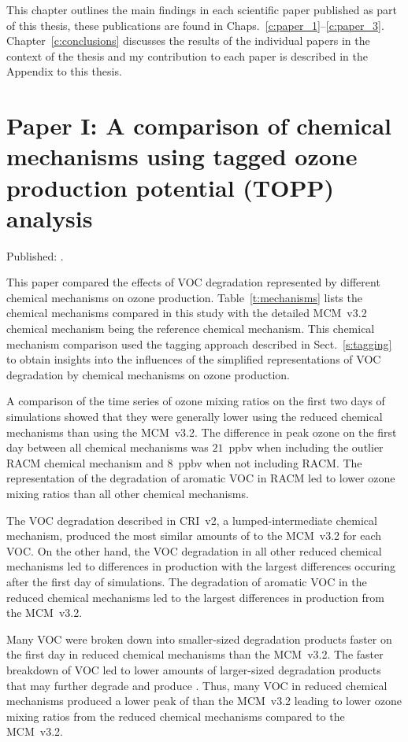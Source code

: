 This chapter outlines the main findings in each scientific paper published as part of this thesis, these publications are found in Chaps.~\ref{c:paper_1}--\ref{c:paper_3}.
Chapter~\ref{c:conclusions} discusses the results of the individual papers in the context of the thesis and my contribution to each paper is described in the Appendix to this thesis.

\singlespacing
\section{Paper I: A comparison of chemical mechanisms using tagged ozone production potential (TOPP) analysis} \label{s:chemical_mechanism_results} 
\onehalfspacing

\noindent
Published: .
\vspace{5mm}

This paper compared the effects of VOC degradation represented by different chemical mechanisms on ozone production.
Table~\ref{t:mechanisms} lists the chemical mechanisms compared in this study with the detailed MCM~v3.2 chemical mechanism being the reference chemical mechanism.
This chemical mechanism comparison used the tagging approach described in Sect.~\ref{s:tagging} to obtain insights into the influences of the simplified representations of VOC degradation by chemical mechanisms on ozone production.

\newpage
A comparison of the time series of ozone mixing ratios on the first two days of simulations showed that they were generally lower using the reduced chemical mechanisms than using the MCM~v3.2.
The difference in peak ozone on the first day between all chemical mechanisms was $21$~ppbv when including the outlier RACM chemical mechanism and $8$~ppbv when not including RACM.
The representation of the degradation of aromatic VOC in RACM led to lower ozone mixing ratios than all other chemical mechanisms.

The VOC degradation described in CRI~v2, a lumped-intermediate chemical mechanism, produced the most similar amounts of  to the MCM~v3.2 for each VOC.
On the other hand, the VOC degradation in all other reduced chemical mechanisms led to differences in  production with the largest differences occuring after the first day of simulations.
The degradation of aromatic VOC in the reduced chemical mechanisms led to the largest differences in  production from the MCM~v3.2.

Many VOC were broken down into smaller-sized degradation products faster on the first day in reduced chemical mechanisms than the MCM~v3.2.
The faster breakdown of VOC led to lower amounts of larger-sized degradation products that may further degrade and produce .
Thus, many VOC in reduced chemical mechanisms produced a lower peak of  than the MCM~v3.2 leading to lower ozone mixing ratios from the reduced chemical mechanisms compared to the MCM~v3.2.

